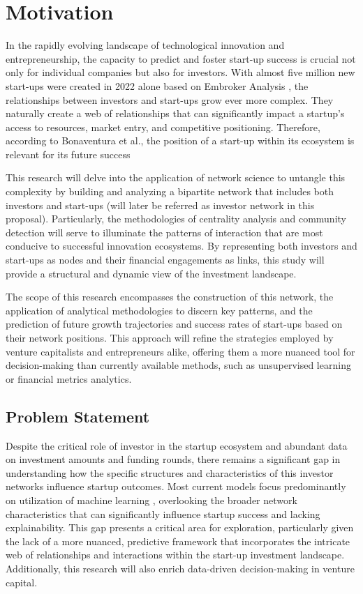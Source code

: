 \documentclass[a4paper,11pt]{article}
\begin{document}
\section{Motivation}
In the rapidly evolving landscape of technological innovation and entrepreneurship, the capacity to predict and foster start-up success is crucial not only for individual companies but also for investors. With almost five million new start-ups were created in 2022 alone based on Embroker Analysis \cite{embroker2024a}, the relationships between investors and start-ups grow ever more complex. They naturally create a web of relationships that can significantly impact a startup’s access to resources, market entry, and competitive positioning. Therefore, according to Bonaventura et al., the position of a start-up within its ecosystem is relevant for its future success \cite{uzzi2021a}

This research will delve into the application of network science to untangle this complexity by building and analyzing a bipartite network that includes both investors and start-ups (will later be referred as investor network in this proposal). Particularly, the methodologies of centrality analysis and community detection will serve to illuminate the patterns of interaction that are most conducive to successful innovation ecosystems. By representing both investors and start-ups as nodes and their financial engagements as links, this study will provide a structural and dynamic view of the investment landscape.

The scope of this research encompasses the construction of this network, the application of analytical methodologies to discern key patterns, and the prediction of future growth trajectories and success rates of start-ups based on their network positions. This approach will refine the strategies employed by venture capitalists and entrepreneurs alike, offering them a more nuanced tool for decision-making than currently available methods, such as unsupervised learning or financial metrics analytics.

\subsection{Problem Statement}
Despite the critical role of investor in the startup ecosystem and abundant data on investment amounts and funding rounds, there remains a significant gap in understanding how the specific structures and characteristics of this investor networks influence startup outcomes. Most current models focus predominantly on utilization of machine learning \cite{krishna2016a} \cite{carniel2023a} \cite{sharchilev2018a} \cite{yang2020a}, overlooking the broader network characteristics that can significantly influence startup success and lacking explainability. This gap presents a critical area for exploration, particularly given the lack of a more nuanced, predictive framework that incorporates the intricate web of relationships and interactions within the start-up investment landscape. Additionally, this research will also enrich data-driven decision-making in venture capital.
\end{document}
